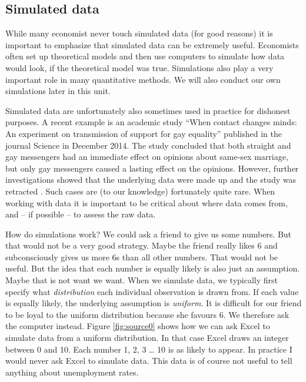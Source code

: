 \documentclass[]{book}
\begin{document}
\hypertarget{simulated-data}{%
\subsection{Simulated data}\label{simulated-data}}

While many economist never touch simulated data (for good reasons) it is important to emphasize that simulated data can be extremely useful. Economists often set up theoretical models and then use computers to simulate how data would look, if the theoretical model was true. Simulations also play a very important role in many quantitative methods. We will also conduct our own simulations later in this unit.

Simulated data are unfortunately also sometimes used in practice for dishonest purposes. A recent example is an academic study ``When contact changes minds: An experiment on transmission of support for gay equality'' \citep{lacour2014contact} published in the journal Science in December 2014. The study concluded that both straight and gay messengers had an immediate effect on opinions about same-sex marriage, but only gay messengers caused a lasting effect on the opinions. However, further investigations showed that the underlying data were made up and the study was retracted \citep{lacour} . Such cases are (to our knowledge) fortunately quite rare. When working with data it is important to be critical about where data comes from, and -- if possible -- to assess the raw data.

How do simulations work? We could ask a friend to give us some numbers. But that would not be a very good strategy. Maybe the friend really likes 6 and subconsciously gives us more 6s than all other numbers. That would not be useful. But the idea that each number is equally likely is also just an assumption. Maybe that is not want we want. When we simulate data, we typically first specify what \emph{distribution} each individual observation is drawn from. If each value is equally likely, the underlying assumption is \emph{uniform}. It is difficult for our friend to be loyal to the uniform distribution because she favours 6. We therefore ask the computer instead. Figure \ref{fig:source0} shows how we can ask Excel to simulate data from a uniform distribution. In that case Excel draws an integer between 0 and 10. Each number 1, 2, 3 \ldots{} 10 is as likely to appear. In practice I would never ask Excel to simulate data. This data is of course not useful to tell anything about unemployment rates.
\end{document}

